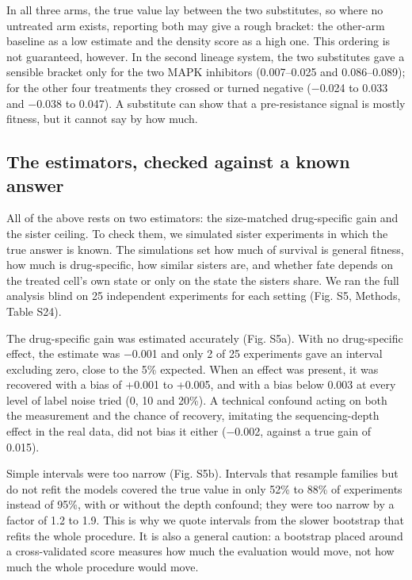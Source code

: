 \documentclass[11pt,a4paper]{article}
\begin{document}
In all three arms, the true value lay between the two substitutes, so where no untreated arm exists, reporting both may give a rough bracket: the other-arm baseline as a low estimate and the density score as a high one. This ordering is not guaranteed, however. In the second lineage system, the two substitutes gave a sensible bracket only for the two MAPK inhibitors (0.007--0.025 and 0.086--0.089); for the other four treatments they crossed or turned negative ($-$0.024 to 0.033 and $-$0.038 to 0.047). A substitute can show that a pre-resistance signal is mostly fitness, but it cannot say by how much.

\subsection*{The estimators, checked against a known answer}

All of the above rests on two estimators: the size-matched drug-specific gain and the sister ceiling. To check them, we simulated sister experiments in which the true answer is known. The simulations set how much of survival is general fitness, how much is drug-specific, how similar sisters are, and whether fate depends on the treated cell's own state or only on the state the sisters share. We ran the full analysis blind on 25 independent experiments for each setting (Fig. S5, Methods, Table S24).

The drug-specific gain was estimated accurately (Fig. S5a). With no drug-specific effect, the estimate was $-$0.001 and only 2 of 25 experiments gave an interval excluding zero, close to the 5\% expected. When an effect was present, it was recovered with a bias of +0.001 to +0.005, and with a bias below 0.003 at every level of label noise tried (0, 10 and 20\%). A technical confound acting on both the measurement and the chance of recovery, imitating the sequencing-depth effect in the real data, did not bias it either ($-$0.002, against a true gain of 0.015).

Simple intervals were too narrow (Fig. S5b). Intervals that resample families but do not refit the models covered the true value in only 52\% to 88\% of experiments instead of 95\%, with or without the depth confound; they were too narrow by a factor of 1.2 to 1.9. This is why we quote intervals from the slower bootstrap that refits the whole procedure. It is also a general caution: a bootstrap placed around a cross-validated score measures how much the evaluation would move, not how much the whole procedure would move.
\end{document}

